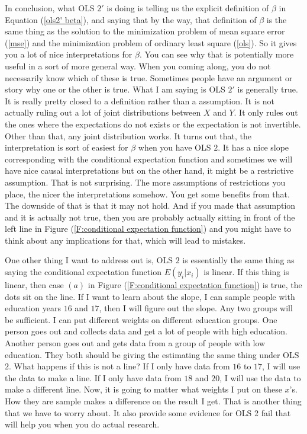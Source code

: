 \documentclass[11pt,a4paper]{amsart}
\theoremstyle{plain}
\theoremstyle{definition}
\begin{document}
	In conclusion, what OLS $2'$ is doing is telling us the explicit definition of $\beta$ in Equation (\ref{ols2' beta}), and saying that by the way, that definition of $\beta$ is the same thing as the solution to the minimization problem of mean square error (\ref{mse}) and the minimization  problem of ordinary least square (\ref{ols}). So it gives you a lot of nice interpretations for $\beta$. You can see why that is potentially more useful in a sort of more general way. When you coming along, you do not necessarily know which of these is true. Sometimes people have an argument or story why one or the other is true. What I am saying is OLS $2'$ is generally true. It is really pretty closed to a definition rather than a assumption. It is not actually ruling out a lot of joint distributions between $X$ and $Y$. It only rules out the ones where the expectations do not exists or the expectation is not invertible. Other than that, any joint distribution works. It turns out that, the interpretation is sort of easiest for $\beta$ when you have OLS $2$. It has a nice slope corresponding with the conditional expectation function and sometimes we will have nice causal interpretations but on the other hand, it might be a restrictive assumption. That is not surprising. The more assumptions of restrictions you place, the nicer the interpretations somehow. You get some benefits from that. The downside of that is that it may not hold. And if you made that assumption and it is actually not true, then you are probably actually sitting in front of the left line in Figure (\ref{F:conditional expectation function}) and you might have to think about any implications for that, which will lead to mistakes. \par 
	One other thing I want to address out is, OLS $2$ is essentially the same thing as saying the conditional expectation function $E(y_{i} | x_{i})$ is linear. If this thing is linear, then case $(a)$ in Figure (\ref{F:conditional expectation function}) is true, the dots sit on the line. If I want to learn about the slope, I can sample people with education years $16$ and $17$, then I will figure out the slope. Any two groups will be sufficient. I can put different weights on different education groups. One person goes out and collects data and get a lot of people with high education. Another person goes out and gets data from a group of people with low education. They both should be giving the estimating the same thing under OLS $2$. What happens if this is not a line? If I only have data from $16$ to $17$, I will use the data to make a line. If I only have data from $18$ and $20$, I will use the data to make a different line. Now, it is going to matter what weights I put on these $x$'s. How they are sample makes a difference on the result I get. That is another thing that we have to worry about. It also provide some evidence for OLS 2 fail that will help you when you do actual research. 
	
\end{document}
